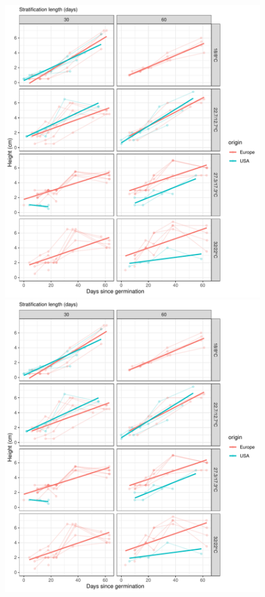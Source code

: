 \documentclass[12pt]{article}\usepackage[]{graphicx}\usepackage[]{color}
\begin{document}
\begin{figure}[H]
  {\includegraphics[scale=.5, page=2, trim=0cm 0cm 2.9cm 0cm, clip=TRUE]{supplement.pdf}}
  {\includegraphics[scale=.5, page=3, trim=0cm 0cm 2.9cm 0cm, clip=TRUE]{supplement.pdf}}

\end{figure}
\end{document}
